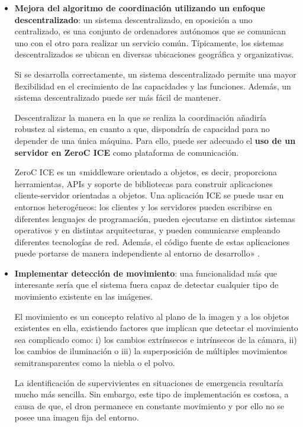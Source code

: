 \begin{itemize}
\item \textbf{Mejora del algoritmo de coordinación utilizando un enfoque descentralizado}: un sistema descentralizado, en oposición a uno centralizado, es una conjunto de ordenadores autónomos que se comunican uno con el otro para realizar un servicio común. Típicamente, los sistemas descentralizados se ubican en diversas ubicaciones geográfica y organizativas.

Si se desarrolla correctamente, un sistema descentralizado permite una mayor flexibilidad en el crecimiento de las capacidades y las funciones. Además, un sistema descentralizado puede ser más fácil de mantener.

Descentralizar la manera en la que se realiza la coordinación añadiría robustez al sistema, en cuanto a que, dispondría de capacidad para no depender de una única máquina. Para ello, puede ser adecuado el \textbf{uso de un servidor en ZeroC \acs{ICE}} como plataforma de comunicación.

ZeroC \acs{ICE} es un «middleware orientado a objetos, es decir, proporciona herramientas, \acs{API}s y soporte de bibliotecas para construir aplicaciones cliente-servidor orientadas a objetos. Una aplicación \acs{ICE} se puede usar en entornos heterogéneos: los clientes y los servidores pueden escribirse en diferentes lenguajes de programación, pueden ejecutarse en distintos sistemas operativos y en distintas arquitecturas, y pueden comunicarse empleando diferentes tecnologías de red. Además, el código fuente de estas aplicaciones puede portarse de manera independiente al entorno de desarrollo» \cite{futuro2}.
\item \textbf{Implementar detección de movimiento}: una funcionalidad más que interesante sería que el sistema fuera capaz de detectar cualquier tipo de movimiento existente en las imágenes.
 
El movimiento es un concepto relativo al plano de la imagen y a los objetos existentes en ella, existiendo factores que implican que detectar el movimiento sea complicado como: i) los cambios extrínsecos e intrínsecos de la cámara, ii) los cambios de iluminación o iii) la superposición de múltiples movimientos semitransparentes como la niebla o el polvo. 

La identificación de supervivientes en situaciones de emergencia resultaría mucho más sencilla. Sin embargo, este tipo de implementación es costosa, a causa de que, el dron permanece en constante movimiento y por ello no se posee una imagen fija del entorno. 


\end{itemize}
